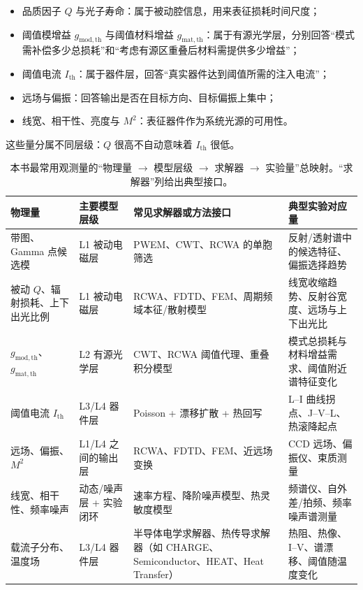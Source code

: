 \begin{itemize}
  \item 品质因子 $Q$ 与光子寿命：属于被动腔信息，用来表征损耗时间尺度；
  \item 阈值模增益 $g_\mathrm{mod,th}$ 与阈值材料增益 $g_\mathrm{mat,th}$：属于有源光学层，分别回答“模式需补偿多少总损耗”和“考虑有源区重叠后材料需提供多少增益”；
  \item 阈值电流 $I_\mathrm{th}$：属于器件层，回答“真实器件达到阈值所需的注入电流”；
  \item 远场与偏振：回答输出是否在目标方向、目标偏振上集中；
  \item 线宽、相干性、亮度与 $M^2$：表征器件作为系统光源的可用性。
\end{itemize}

这些量分属不同层级：$Q$ 很高不自动意味着 $I_\mathrm{th}$ 很低。

\begin{table}[htbp]
  \centering
  \footnotesize
  \caption{本书最常用观测量的“物理量 $\rightarrow$ 模型层级 $\rightarrow$ 求解器 $\rightarrow$ 实验量”总映射。“求解器”列给出典型接口。}
  \label{tab:quantity-model-solver-exp}
  \setlength{\tabcolsep}{4pt}
  \begin{tabularx}{\textwidth}{@{}p{2.2cm}p{2.5cm}p{3.3cm}Y@{}}
    \toprule
    物理量 & 主要模型层级 & 常见求解器或方法接口 & 典型实验对应量 \\
    \midrule
    带图、Gamma 点候选模 & L1 被动电磁层 & PWEM、CWT、RCWA 的单胞筛选 & 反射/透射谱中的候选特征、偏振选择趋势 \\
    被动 $Q$、辐射损耗、上下出光比例 & L1 被动电磁层 & RCWA、FDTD、FEM、周期频域本征/散射模型 & 线宽收缩趋势、反射谷宽度、远场与上下出光比 \\
    $g_{\mathrm{mod,th}}$、$g_{\mathrm{mat,th}}$ & L2 有源光学层 & CWT、RCWA 阈值代理、重叠积分模型 & 模式总损耗与材料增益需求、阈值附近谱特征变化 \\
    阈值电流 $I_{\mathrm{th}}$ & L3/L4 器件层 & Poisson + 漂移扩散 + 热回写 & L--I 曲线拐点、J--V--L、热滚降起点 \\
    远场、偏振、$M^2$ & L1/L4 之间的输出层 & RCWA、FDTD、FEM、近远场变换 & CCD 远场、偏振仪、束质测量 \\
    线宽、相干性、频率噪声 & 动态/噪声层 + 实验闭环 & 速率方程、降阶噪声模型、热灵敏度模型 & 频谱仪、自外差/拍频、频率噪声谱测量 \\
    载流子分布、温度场 & L3/L4 器件层 & 半导体电学求解器、热传导求解器（如 CHARGE、Semiconductor、HEAT、Heat Transfer） & 热阻、热像、I--V、谱漂移、阈值随温度变化 \\
    \bottomrule
  \end{tabularx}
\end{table}

